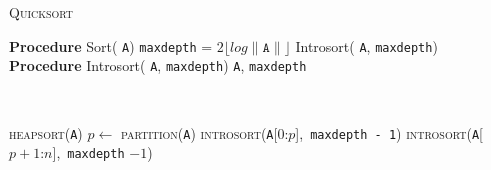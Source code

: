 \documentclass[10pt,letterpaper]{article}
\begin{document}
\begin{algorithm}\caption{\textsc{Quicksort}}\label{alg:Quicksort}
 \begin{algorithmic}[1]
 \State \textbf{Procedure} Sort( \texttt{A})
\State \texttt{maxdepth} = $2\lfloor \textit{log} \| \texttt{A} \|  \rfloor $
 \State Introsort( \texttt{A}, \texttt{maxdepth})
 \State ~
 \State \textbf{Procedure} Introsort( \texttt{A}, \texttt{maxdepth})
    \texttt{A}, \texttt{maxdepth}
   

\State ~

	\State \textsc{heapsort}(\texttt{A})
\Else
	\State $p \leftarrow$ \textsc{partition}(\texttt{A})
    \State \textsc{introsort}(\texttt{A}[0:$p$],\ \texttt{maxdepth - 1})
    \State \textsc{introsort}(\texttt{A}[$p + 1$:$n$],\ \texttt{maxdepth} $- 1$)
    
\EndIf

 \end{algorithmic}
\end{algorithm}
\end{document}
